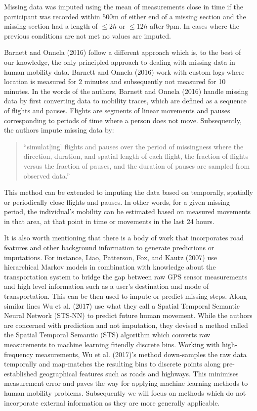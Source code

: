 \documentclass[man]{apa6}
\theoremstyle{definition}
\theoremstyle{definition}
\theoremstyle{definition}
\theoremstyle{remark}
\begin{document}
Missing data was imputed using the mean of measurements close in time if
the participant was recorded within 500m of either end of a missing
section and the missing section had a length of \(\leq 2h\) or
\(\leq 12h\) after 9pm. In cases where the previous conditions are not
met no values are imputed.

Barnett and Onnela (2016) follow a different approach which is, to the
best of our knowledge, the only principled approach to dealing with
missing data in human mobility data. Barnett and Onnela (2016) work with
custom logs where location is measured for 2 minutes and subsequently
not measured for 10 minutes. In the words of the authors, Barnett and
Onnela (2016) handle missing data by first converting data to mobility
traces, which are defined as a sequence of flights and pauses. Flights
are segments of linear movements and pauses corresponding to periods of
time where a person does not move. Subsequently, the authors impute
missing data by:

\begin{quote}
\enquote{simulat{[}ing{]} flights and pauses over the period of
missingness where the direction, duration, and spatial length of each
flight, the fraction of flights versus the fraction of pauses, and the
duration of pauses are sampled from observed data.}
\end{quote}

This method can be extended to imputing the data based on temporally,
spatially or periodically close flights and pauses. In other words, for
a given missing period, the individual's mobility can be estimated based
on measured movements in that area, at that point in time or movements
in the last 24 hours.

It is also worth mentioning that there is a body of work that
incorporates road features and other background information to generate
predictions or imputations. For instance, Liao, Patterson, Fox, and
Kautz (2007) use hierarchical Markov models in combination with
knowledge about the transportation system to bridge the gap between raw
GPS sensor measurements and high level information such as a user's
destination and mode of transportation. This can be then used to impute
or predict missing steps. Along similar lines Wu et al. (2017) use what
they call a Spatial Temporal Semantic Neural Network (STS-NN) to predict
future human movement. While the authors are concerned with prediction
and not imputation, they devised a method called the Spatial Temporal
Semantic (STS) algorithm which converts raw measurements to machine
learning friendly discrete bins. Working with high-frequency
measurements, Wu et al. (2017)'s method down-samples the raw data
temporally and map-matches the resulting bins to discrete points along
pre-established geographical features such as roads and highways. This
minimises measurement error and paves the way for applying machine
learning methods to human mobility problems. Subsequently we will focus
on methods which do not incorporate external information as they are
more generally applicable.
\end{document}
